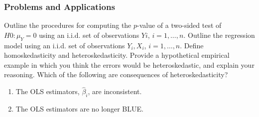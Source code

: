 

\begin{frame}
\frametitle{Problems and Applications}
Outline the procedures for computing the $p$-value of a two-sided test of $H0\colon\mu_{Y}=0$ using an i.i.d. set of observations $Yi$, $i=1,\ldots,n$. Outline the regression model using an i.i.d. set of observations $Y_{i},X_{i}$, $i=1,\ldots,n$.
\pause
{}
Define homoskedasticity and heteroskedasticity. Provide a hypothetical empirical example in which you think the errors would be heteroskedastic, and explain your reasoning.
\pause
{}
Which of the following are consequences of heteroskedasticity?
\begin{enumerate}
\item The OLS estimators, $\hat{\beta}_{i}$, are inconsistent.
\item The OLS estimators are no longer BLUE.
\end{enumerate}
\end{frame}


